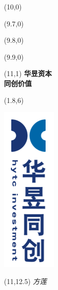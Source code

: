 \begin{titlepage}

\setlength\parindent{0pt}


\begin{textblock}{6}(10,0)
    \rule{0mm}{420mm}
\end{textblock}

\begin{textblock}{.02}(9.7,0)
    \rule{0mm}{420mm}
\end{textblock}

\begin{textblock}{.02}(9.8,0)
    \rule{0mm}{420mm}
\end{textblock}

\begin{textblock}{.02}(9.9,0)
    \rule{0mm}{420mm}
\end{textblock}

\begin{textblock}{3}(11,1)
    {\Huge \textbf{华昱资本}\\[5pt] \textbf{\hspace{2cm}同创价值}}
\end{textblock}

\begin{textblock}{12}(1.8,6)
\textblockcolour{}
\begin{center}
    \includegraphics[scale=1.2]{imgs/hytc.png}
\end{center}
\end{textblock}

\begin{textblock}{4}(11,12.5)
    \vspace{2cm}
    {\huge \textit{方莲}}\\[5pt]
    {\Large \lnotesdate}
\end{textblock}


\end{titlepage}
